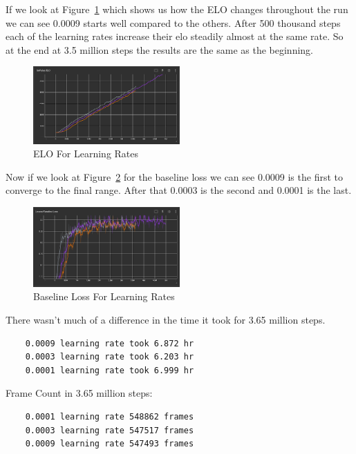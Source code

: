 \documentclass{LSkill}
\begin{document}
If we look at Figure~\ref{fig:ELO For Learning Rates} which shows us how the ELO changes throughout the run we can see 0.0009 starts well compared to the others. After 500 thousand steps each of the learning rates increase their elo steadily almost at the same rate. So at the end at 3.5 million steps the results are the same as the beginning.

\begin{figure}[htbp]
    \centering
    \includegraphics[width=0.5\textwidth]{figure 3.png} 
    \caption{ELO For Learning Rates}
    \label{fig:ELO For Learning Rates}
\end{figure}

Now if we look at Figure~\ref{fig:Baseline Loss For Learning Rates} for the baseline loss we can see 0.0009 is the first to converge to the final range. After that 0.0003 is the second and 0.0001 is the last.

\begin{figure}[htbp]
    \centering
    \includegraphics[width=0.5\textwidth]{figure 4.png} 
    \caption{Baseline Loss For Learning Rates}
    \label{fig:Baseline Loss For Learning Rates}
\end{figure}
\vspace{1cm}

There wasn’t much of a difference in the time it took for 3.65 million steps. 

\begin{verbatim}
	0.0009 learning rate took 6.872 hr
	0.0003 learning rate took 6.203 hr
	0.0001 learning rate took 6.999 hr
\end{verbatim}

	Frame Count in 3.65 million steps:

\begin{verbatim}
	0.0001 learning rate 548862 frames
	0.0003 learning rate 547517 frames
	0.0009 learning rate 547493 frames
\end{verbatim}
\end{document}
